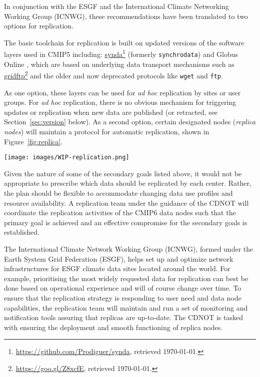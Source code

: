 \documentclass[gmd,manuscript]{copernicus}
\newcommand{\pllabel}[1]{\label{p-#1}\linelabel{l-#1}}
\newcommand{\urlref}[2] {\href{#1}{#2}\footnote{\url{#1}, retrieved \today.}}
\begin{document}
In conjunction with the ESGF and the International Climate Networking
Working Group (ICNWG), these recommendations have been translated to
two options for replication.

The basic toolchain for replication is built on updated versions of
the software layers used in CMIP5 including:
\urlref{https://github.com/Prodiguer/synda}{synda} (formerly
\texttt{synchrodata}) and Globus Online \citep{ref:chardetal2015}, which
are based on underlying data transport mechanisms such as
\urlref{https://goo.gl/Z8xcfE}{gridftp} and the older and now deprecated
protocols like \texttt{wget} and \texttt{ftp}.

As one option, these layers can be used for \emph{ad hoc} replication by
sites or user groups. For \emph{ad hoc} replication, there is no
obvious mechanism for triggering updates or replication when new data
are published (or retracted, see Section~\ref{sec:version} below).
As a second option, certain designated nodes (\emph{replica nodes}) will maintain a protocol
for automatic replication, shown in Figure~\ref{fig:replica}.

\begin{figure*}
  \begin{center}
    \texttt{[image: images/WIP-replication.png]}
  \end{center}
  \caption{CMIP6 replication from data nodes to replica centers and
    between replica centers coordinated by a CMIP6 replication team,
    under the guidance of the CDNOT.}
  \label{fig:replica}
\end{figure*}

Given the nature of some of the secondary goals listed above, it would
not be appropriate to prescribe which data should be replicated by
each center. Rather, the plan should be flexible to accommodate
changing data use profiles and resource availability.
\pllabel{RC1-61}
A replication team under the guidance of the CDNOT will coordinate the
replication activities of the CMIP6 data nodes such that the primary
goal is achieved and an effective compromise for the secondary goals
is established.

The International Climate Network Working Group (ICNWG), formed under
the Earth System Grid Federation (ESGF), helps set up and optimize
network infrastructures for ESGF climate data sites located around the
world. For example, prioritising the most widely requested data for
replication can best be done based on operational experience and will
of course change over time. To ensure that the replication strategy is
responding to user need and data node capabilities, the replication
team will maintain and run a set of monitoring and notification tools
assuring that replicas are up-to-date. The CDNOT is tasked with
ensuring the deployment and smooth functioning of replica nodes.
\end{document}
